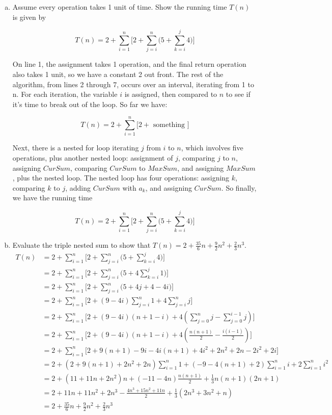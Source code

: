 \documentclass{article}
\begin{document}
\begin{enumerate}[(a)]
  \item Assume every operation takes 1 unit of time. Show the running time $T(n)$ is given by

  $$T(n) = 2 + \sum_{i=1}^n \Big[2 + \sum_{j=i}^n \big(5 + \sum_{k=i}^j 4\big)\Big]$$

    On line 1, the assignment takes 1 operation, and the final return operation also takes 1 unit, so we have a constant 2 out front. The rest of the algorithm, from lines 2 through 7, occurs over an interval, iterating from 1 to n. For each iteration, the variable $i$ is assigned, then compared to $n$ to see if it's time to break out of the loop. So far we have:

    $$T(n) = 2 + \sum_{i=1}^n \Big[ 2 + \text{ something }\Big]$$

    Next, there is a nested for loop iterating $j$ from $i$ to $n$, which involves five operations, plus another nested loop: assignment of $j$, comparing $j$ to $n$, assigning $CurSum$, comparing $CurSum$ to $MaxSum$, and assigning $MaxSum$, plus the nested loop. The nested loop has four operations: assigning $k$, comparing $k$ to $j$, adding $CurSum$ with $a_k$, and assigning $CurSum$. So finally, we have the running time

  $$T(n) = 2 + \sum_{i=1}^n \Big[2 + \sum_{j=i}^n \big(5 + \sum_{k=i}^j 4\big)\Big]$$

  \item Evaluate the triple nested sum to show that $T(n) = 2 + \frac{35}{6} n + \frac{9}{2}n^2 + \frac{2}{3} n^3$.
    \begin{align*}
      T(n) &= 2 + \sum_{i=1}^n \Big[2 + \sum_{j=i}^n \big(5 + \sum_{k=i}^j 4\big)\Big] \\
      &= 2 + \sum_{i=1}^n \Big[2 + \sum_{j=i}^n \big(5 + 4\sum_{k=i}^j 1\big)\Big] \\ 
      &= 2 + \sum_{i=1}^n \Big[2 + \sum_{j=i}^n \big(5 + 4j + 4 - 4i)\Big] \\ 
      &= 2 + \sum_{i=1}^n \Big[2 + (9 -4i)\sum_{j=i}^n 1 + 4\sum_{j=i}^n j\Big] \\ 
      &= 2 + \sum_{i=1}^n \Big[2 + (9 -4i)(n+1-i) + 4(\sum_{j=0}^n j - \sum_{j=0}^{i-1} j) \Big] \\ 
      &= 2 + \sum_{i=1}^n \Big[2 + (9 -4i)(n+1-i) + 4(\frac{n(n+1)}{2} - \frac{i(i-1)}{2}) \Big] \\ 
      &= 2 + \sum_{i=1}^n \Big[2 + 9(n+1) - 9i -4i(n+1) + 4i^2 + 2n^2 + 2n - 2i^2 + 2i \Big] \\
      &= 2 + (2 + 9(n+1) + 2n^2 + 2n)\sum_{i=1}^n 1 + (-9-4(n+1)+2)\sum_{i=1}^n i + 2\sum_{i=1}^n i^2 \\
      &= 2 + (11 + 11n + 2n^2)n + (-11 -4n) \frac{n(n+1)}{2} + \frac{1}{3}n(n+1)(2n+1) \\
      &= 2 + 11n + 11n^2 + 2n^3 - \frac{4n^3 + 15n^2 + 11n}{2} + \frac{1}{3}(2n^3 + 3n^2 + n) \\
      &= 2 + \frac{35}{6}n + \frac{9}{2}n^2 + \frac{2}{3}n^3
    \end{align*}
\end{enumerate}
\end{document}
